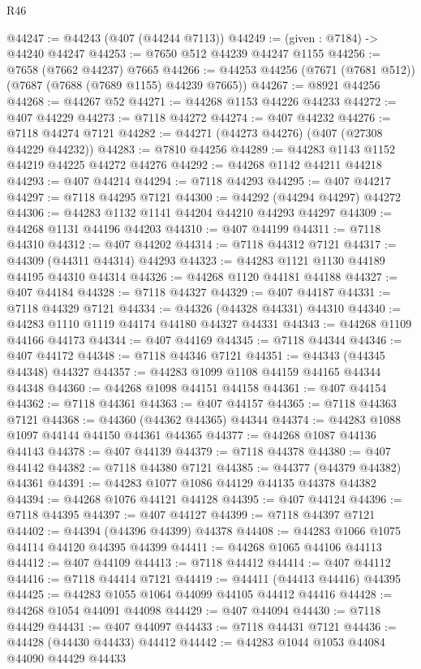 \begin{lexlean}{R46}
\begin{coremodule}
@44247 := @44243 (@407 (@44244 @7113))
@44249 := (given : @7184) -> @44240 @44247
@44253 := @7650 @512 @44239 @44247 @1155
@44256 := @7658 (@7662 @44237) @7665
@44266 := @44253 @44256 (@7671 (@7681 @512)) (@7687 (@7688 (@7689 @1155) @44239 @7665))
@44267 := @8921 @44256
@44268 := @44267 @52
@44271 := @44268 @1153 @44226 @44233
@44272 := @407 @44229
@44273 := @7118 @44272
@44274 := @407 @44232
@44276 := @7118 @44274 @7121
@44282 := @44271 (@44273 @44276) (@407 (@27308 @44229 @44232))
@44283 := @7810 @44256
@44289 := @44283 @1143 @1152 @44219 @44225 @44272 @44276
@44292 := @44268 @1142 @44211 @44218
@44293 := @407 @44214
@44294 := @7118 @44293
@44295 := @407 @44217
@44297 := @7118 @44295 @7121
@44300 := @44292 (@44294 @44297) @44272
@44306 := @44283 @1132 @1141 @44204 @44210 @44293 @44297
@44309 := @44268 @1131 @44196 @44203
@44310 := @407 @44199
@44311 := @7118 @44310
@44312 := @407 @44202
@44314 := @7118 @44312 @7121
@44317 := @44309 (@44311 @44314) @44293
@44323 := @44283 @1121 @1130 @44189 @44195 @44310 @44314
@44326 := @44268 @1120 @44181 @44188
@44327 := @407 @44184
@44328 := @7118 @44327
@44329 := @407 @44187
@44331 := @7118 @44329 @7121
@44334 := @44326 (@44328 @44331) @44310
@44340 := @44283 @1110 @1119 @44174 @44180 @44327 @44331
@44343 := @44268 @1109 @44166 @44173
@44344 := @407 @44169
@44345 := @7118 @44344
@44346 := @407 @44172
@44348 := @7118 @44346 @7121
@44351 := @44343 (@44345 @44348) @44327
@44357 := @44283 @1099 @1108 @44159 @44165 @44344 @44348
@44360 := @44268 @1098 @44151 @44158
@44361 := @407 @44154
@44362 := @7118 @44361
@44363 := @407 @44157
@44365 := @7118 @44363 @7121
@44368 := @44360 (@44362 @44365) @44344
@44374 := @44283 @1088 @1097 @44144 @44150 @44361 @44365
@44377 := @44268 @1087 @44136 @44143
@44378 := @407 @44139
@44379 := @7118 @44378
@44380 := @407 @44142
@44382 := @7118 @44380 @7121
@44385 := @44377 (@44379 @44382) @44361
@44391 := @44283 @1077 @1086 @44129 @44135 @44378 @44382
@44394 := @44268 @1076 @44121 @44128
@44395 := @407 @44124
@44396 := @7118 @44395
@44397 := @407 @44127
@44399 := @7118 @44397 @7121
@44402 := @44394 (@44396 @44399) @44378
@44408 := @44283 @1066 @1075 @44114 @44120 @44395 @44399
@44411 := @44268 @1065 @44106 @44113
@44412 := @407 @44109
@44413 := @7118 @44412
@44414 := @407 @44112
@44416 := @7118 @44414 @7121
@44419 := @44411 (@44413 @44416) @44395
@44425 := @44283 @1055 @1064 @44099 @44105 @44412 @44416
@44428 := @44268 @1054 @44091 @44098
@44429 := @407 @44094
@44430 := @7118 @44429
@44431 := @407 @44097
@44433 := @7118 @44431 @7121
@44436 := @44428 (@44430 @44433) @44412
@44442 := @44283 @1044 @1053 @44084 @44090 @44429 @44433

\end{coremodule}
\end{lexlean}

